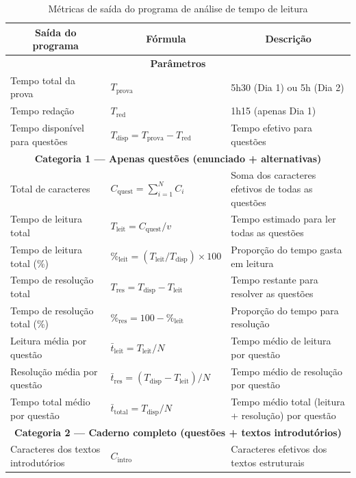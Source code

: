 \documentclass[a4paper,10pt, twocolumn]{article}
\begin{document}
\begin{table}[htb]
\centering
\caption{Métricas de saída do programa de análise de tempo de leitura}
\label{tab:saidas_tempo}
\scriptsize
\begin{tabular}{lll}
\toprule 
\multicolumn{1}{c}{\textbf{Saída do programa}} & \multicolumn{1}{c}{\textbf{Fórmula}} & \multicolumn{1}{c}{\textbf{Descrição}} \\
\midrule
\multicolumn{3}{c}{\textbf{Parâmetros}} \\
\midrule
Tempo total da prova & $T_{\text{prova}}$ & 5h30 (Dia 1) ou 5h (Dia 2) \\
Tempo redação & $T_{\text{red}}$ & 1h15 (apenas Dia 1) \\
Tempo disponível para questões & $T_{\text{disp}} = T_{\text{prova}} - T_{\text{red}}$ & Tempo efetivo para questões \\
\midrule
\multicolumn{3}{c}{\textbf{Categoria 1 — Apenas questões (enunciado + alternativas)}} \\
\midrule
Total de caracteres & $C_{\text{quest}} = \sum_{i=1}^{N} C_i$ & Soma dos caracteres efetivos de todas as questões \\
Tempo de leitura total & $T_{\text{leit}} = C_{\text{quest}} / v$ & Tempo estimado para ler todas as questões \\
Tempo de leitura total (\%) & $\%_{\text{leit}} = (T_{\text{leit}} / T_{\text{disp}}) \times 100$ & Proporção do tempo gasta em leitura \\
Tempo de resolução total & $T_{\text{res}} = T_{\text{disp}} - T_{\text{leit}}$ & Tempo restante para resolver as questões \\
Tempo de resolução total (\%) & $\%_{\text{res}} = 100 - \%_{\text{leit}}$ & Proporção do tempo para resolução \\
Leitura média por questão & $\bar{t}_{\text{leit}} = T_{\text{leit}} / N$ & Tempo médio de leitura por questão \\
Resolução média por questão & $\bar{t}_{\text{res}} = (T_{\text{disp}} - T_{\text{leit}}) / N$ & Tempo médio de resolução por questão \\
Tempo total médio por questão & $\bar{t}_{\text{total}} = T_{\text{disp}} / N$ & Tempo médio total (leitura + resolução) por questão \\
\midrule
\multicolumn{3}{c}{\textbf{Categoria 2 — Caderno completo (questões + textos introdutórios)}} \\
\midrule
Caracteres dos textos introdutórios & $C_{\text{intro}}$ & Caracteres efetivos dos textos estruturais \\

\end{tabular}
\end{table}
\end{document}
